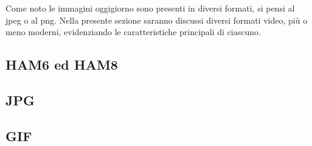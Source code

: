 \documentclass{subfiles}
\begin{document}
Come noto le immagini oggigiorno sono presenti in diversi formati, si pensi al jpeg o al png.
Nella presente sezione saranno discussi diversi formati video, più o meno moderni, evidenziando le caratteristiche principali di ciascuno.

\subsection{HAM6 ed HAM8}

\clearpage

\subsection{JPG}


\subsection{GIF}

\clearpage
\end{document}
